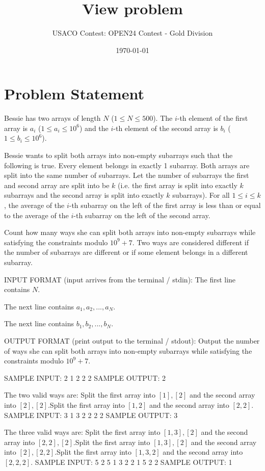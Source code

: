 \documentclass[12pt]{article}
\title{View problem}
\author{USACO Contest: OPEN24 Contest - Gold Division}
\date{\today}
\begin{document}
\maketitle

\section*{Problem Statement}


Bessie has two arrays of length $N$ ($1 \le N \le 500$). The $i$-th element of
the first array is $a_i$ ($1 \le a_i \le 10^6$) and the $i$-th element of the
second array is $b_i$ ($1 \le b_i \le 10^6$). 

Bessie wants to split both arrays into non-empty subarrays such that the
following is true.
Every element belongs in exactly 1 subarray. Both arrays are split
into the same number of subarrays. Let the number of subarrays the first and
second array are split into be $k$ (i.e. the first array is split into exactly
$k$ subarrays and the second array is split into exactly $k$ subarrays). For all $1 \le i \le k$, the average of the $i$-th subarray on the left of
the first array is less than or equal to the average of the $i$-th
subarray on the left of the second array.

Count how many ways she can split both arrays into non-empty subarrays while
satisfying the constraints modulo $10^9+7$. Two ways are considered different if
the number of subarrays are different or if some element belongs in a different
subarray.

INPUT FORMAT (input arrives from the terminal / stdin):
The first line contains $N$.

The next line contains $a_1,a_2,...,a_N$.

The next line contains $b_1,b_2,...,b_N$.

OUTPUT FORMAT (print output to the terminal / stdout):
Output the number of ways she can split both arrays into non-empty subarrays
while satisfying the constraints modulo $10^9+7$.

SAMPLE INPUT:
2
1 2
2 2
SAMPLE OUTPUT: 
2

The two valid ways are:
Split the first array into $[1],[2]$ and the second array into
$[2],[2]$.Split the first array into $[1,2]$ and the second array into
$[2,2]$.
SAMPLE INPUT:
3
1 3 2
2 2 2
SAMPLE OUTPUT: 
3

The three valid ways are:
Split the first array into $[1,3],[2]$ and the second array into
$[2,2],[2]$.Split the first array into $[1,3],[2]$ and the second
array into $[2],[2,2]$.Split the first array into $[1,3,2]$ and the
second array into $[2,2,2]$.
SAMPLE INPUT:
5
2 5 1 3 2
2 1 5 2 2
SAMPLE OUTPUT: 
1
\end{document}
